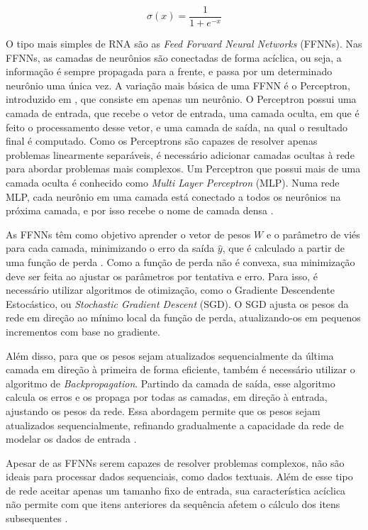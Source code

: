 \documentclass[
	12pt, oneside, a4paper, english, brazil
]{abntex2ppgsi}
\begin{document}
\begin{equation} 
	\sigma(x) = \frac{1}{1 + e^{-x}} 
\end{equation}

O tipo mais simples de RNA são as {\em Feed Forward Neural Networks} (FFNNs). Nas FFNNs, as camadas de neurônios são conectadas de forma acíclica, ou seja, a informação é sempre propagada para a frente, e passa por um determinado neurônio uma única vez. A variação mais básica de uma FFNN é o Perceptron, introduzido em , que consiste em apenas um neurônio. O Perceptron possui uma camada de entrada, que recebe o vetor de entrada, uma camada oculta, em que é feito o processamento desse vetor, e uma camada de saída, na qual o resultado final é computado. Como os Perceptrons são capazes de resolver apenas problemas linearmente separáveis, é necessário adicionar camadas ocultas à rede para abordar problemas mais complexos. Um Perceptron que possui mais de uma camada oculta é conhecido como {\em Multi Layer Perceptron} (MLP). Numa rede MLP, cada neurônio em uma camada está conectado a todos os neurônios na próxima camada, e por isso recebe o nome de camada densa \cite{goodfellow2016}.

As FFNNs têm como objetivo aprender o vetor de pesos $W$ e o parâmetro de viés para cada camada, minimizando o erro da saída $\hat{y}$, que é calculado a partir de uma função de perda \cite{goodfellow2016}. Como a função de perda não é convexa, sua minimização deve ser feita ao ajustar os parâmetros por tentativa e erro. Para isso, é necessário utilizar algoritmos de otimização, como o Gradiente Descendente Estocástico, ou {\em Stochastic Gradient Descent} (SGD). O SGD ajusta os pesos da rede em direção ao mínimo local da função de perda, atualizando-os em pequenos incrementos com base no gradiente. 

Além disso, para que os pesos sejam atualizados sequencialmente da última camada em direção à primeira de forma eficiente, também é necessário utilizar o algoritmo de {\em Backpropagation}. Partindo da camada de saída, esse algoritmo calcula os erros e os propaga por todas as camadas, em direção à entrada, ajustando os pesos da rede. Essa abordagem permite que os pesos sejam atualizados sequencialmente, refinando gradualmente a capacidade da rede de modelar os dados de entrada \cite{shalev2014}.

Apesar de as FFNNs serem capazes de resolver problemas complexos, não são ideais para processar dados sequenciais, como dados textuais. Além de esse tipo de rede aceitar apenas um tamanho fixo de entrada, sua característica acíclica não permite com que itens anteriores da sequência afetem o cálculo dos itens subsequentes \cite{pln2023}.
\end{document}
